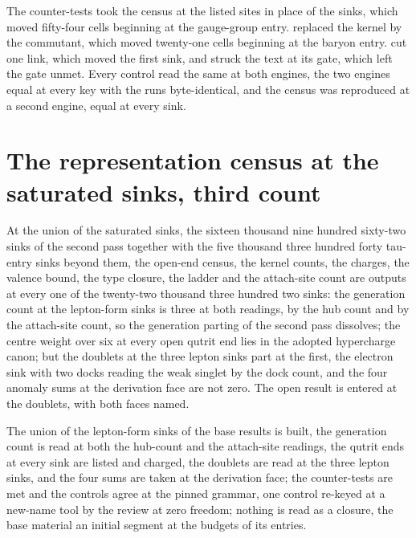 \begin{chproof}[census]
The counter-tests took the census at the listed sites in place of the sinks, which moved fifty-four cells beginning at the gauge-group entry. replaced the kernel by the commutant, which moved twenty-one cells beginning at the baryon entry. cut one link, which moved the first sink, and struck the text at its gate, which left the gate unmet. Every control read the same at both engines, the two engines equal at every key with the runs byte-identical, and the census was reproduced at a second engine, equal at every sink.
\end{chproof}
\section{The representation census at the saturated sinks, third count}\label{mod:IV-3-D538265-w-rcs4}
\begin{chwall}\label{box:IV-3-D538265-w-rcs4:1}
At the union of the saturated sinks, the sixteen thousand nine hundred sixty-two sinks of the second pass together with the five thousand three hundred forty tau-entry sinks beyond them, the open-end census, the kernel counts, the charges, the valence bound, the type closure, the ladder and the attach-site count are outputs at every one of the twenty-two thousand three hundred two sinks: the generation count at the lepton-form sinks is three at both readings, by the hub count and by the attach-site count, so the generation parting of the second pass dissolves; the centre weight over six at every open qutrit end lies in the adopted hypercharge canon; but the doublets at the three lepton sinks part at the first, the electron sink with two docks reading the weak singlet by the dock count, and the four anomaly sums at the derivation face are not zero. The open result is entered at the doublets, with both faces named.
\end{chwall}
The union of the lepton-form sinks of the base results is built, the generation count is read at both the hub-count and the attach-site readings, the qutrit ends at every sink are listed and charged, the doublets are read at the three lepton sinks, and the four sums are taken at the derivation face; the counter-tests are met and the controls agree at the pinned grammar, one control re-keyed at a new-name tool by the review at zero freedom; nothing is read as a closure, the base material an initial segment at the budgets of its entries.

